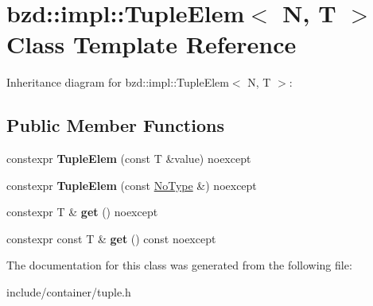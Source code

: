 \hypertarget{classbzd_1_1impl_1_1TupleElem}{}\section{bzd\+:\+:impl\+:\+:Tuple\+Elem$<$ N, T $>$ Class Template Reference}
\label{classbzd_1_1impl_1_1TupleElem}


Inheritance diagram for bzd\+:\+:impl\+:\+:Tuple\+Elem$<$ N, T $>$\+:
\subsection*{Public Member Functions}
\begin{DoxyCompactItemize}
\item 
\mbox{\label{classbzd_1_1impl_1_1TupleElem_a92c5fd1f3bf8a6b84790bad16649d071}} 
constexpr {\bfseries Tuple\+Elem} (const T \&value) noexcept
\item 
\mbox{\label{classbzd_1_1impl_1_1TupleElem_ab5f2f01346dea8855b7397d00cf6b46c}} 
constexpr {\bfseries Tuple\+Elem} (const \hyperlink{structbzd_1_1impl_1_1NoType}{No\+Type} \&) noexcept
\item 
\mbox{\label{classbzd_1_1impl_1_1TupleElem_abb60dfbea755b5575ed04640127923bd}} 
constexpr T \& {\bfseries get} () noexcept
\item 
\mbox{\label{classbzd_1_1impl_1_1TupleElem_ab4f6bbdecf911ca5de2122cd8a94d328}} 
constexpr const T \& {\bfseries get} () const noexcept
\end{DoxyCompactItemize}


The documentation for this class was generated from the following file\+:\begin{DoxyCompactItemize}
\item 
include/container/tuple.\+h\end{DoxyCompactItemize}
